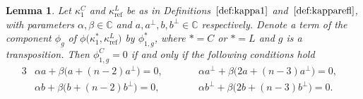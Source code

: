 \documentclass[10pt,a4paper]{amsart}
\numberwithin{equation}{section}
\newtheorem{Lemma}[Theorem]{Lemma}
\DeclareMathOperator{\refl}{ref}
\begin{document}
\begin{Lemma}\label{lemma:simplification*1L2}
Let $\kappa^C_1$ and $\kappa^L_{\refl}$ be as in
Definitions~$\ref{def:kappa1}$ and~$\ref{def:kapparefl}$,
with parameters $\alpha, \beta \in \mathbb{C}$ and $a, a^\perp, b, b^\perp \in \mathbb{C}$
respectively.
Denote a term of the component $\phi_g$ of $\phi\big(\kappa^*_1,\kappa^L_{\refl}\big)$
by $\phi^*_{1,g}$, where $*=C$ or $*=L$ and $g$ is a transposition.
Then $\phi^C_{1,g}=0$ if and only if the following conditions hold
\begin{alignat}{3}
\label{Obstr2PhiC1C2C3L2=0a}
&\alpha a + \beta\big(a+(n-2)a^\perp\big)=0, \qquad &&\alpha a^\perp + \beta\big(2a+(n-3)a^\perp\big)=0,&
\\
\label{Obstr2PhiC1C2C3L2=0b}
&\alpha b + \beta\big(b+(n-2)b^\perp\big)=0, \qquad &&\alpha b^\perp + \beta\big(2b+(n-3)b^\perp\big)=0.&
\end{alignat}
\end{Lemma}
\end{document}
